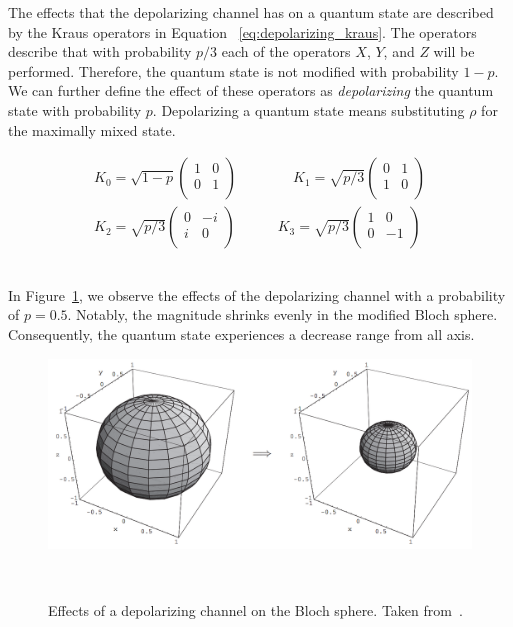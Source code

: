 The effects that the depolarizing channel has on a quantum state
are described by the Kraus operators in Equation
~\ref{eq:depolarizing_kraus}. The operators describe that with
probability \(p/3\) each of the operators \(X\), \(Y\), and \(Z\)
will be performed. Therefore, the quantum state is not modified with
probability \(1-p\). We can further define the effect of these operators
as \textit{depolarizing} the quantum state with probability \(p\).
Depolarizing a quantum state means substituting \(\rho\) for the maximally
mixed state. \

\begin{equation}\label{eq:depolarizing_kraus}
  \begin{split}
    K_0 = \sqrt{1-p} \begin{pmatrix}
            1 & 0 \\
            0 & 1 \\
          \end{pmatrix} \qquad \qquad
    K_1 = \sqrt{p/3} \begin{pmatrix}
            0 & 1 \\
            1 & 0 \\
          \end{pmatrix} \\
    K_2 = \sqrt{p/3} \begin{pmatrix}
            0 & -i \\
            i & 0 \\
          \end{pmatrix}  \qquad \quad
    K_3 = \sqrt{p/3} \begin{pmatrix}
            1 & 0 \\
            0 & -1 \\
          \end{pmatrix}
  \end{split}
\end{equation} \

In Figure~\ref{fig:depolarizing_flip}, we observe the effects of the 
depolarizing channel with a probability of \(p=0.5\). Notably, the
magnitude shrinks evenly in the modified Bloch sphere. Consequently,
the quantum state experiences a decrease range from all axis. \

\begin{figure}[h!]
  \includegraphics[scale=0.39]{figures/depolarizing_channel.png}
  \centering
  \caption{Effects of a depolarizing channel on the Bloch sphere. Taken from~\cite{nielsen_quantum_2010}.}
~\label{fig:depolarizing_flip}
\end{figure} \

